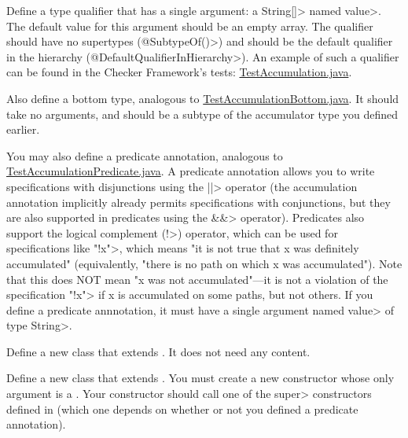 Define a type qualifier that has a single argument: a \<String[]> named \<value>.
The default value for this argument should be an empty array. The
qualifier should have no supertypes (\<@SubtypeOf({})>) and should
be the default qualifier in the hierarchy (\<@DefaultQualifierInHierarchy>).
An example of such a qualifier can be found in the Checker Framework's tests:
\href{https://github.com/typetools/checker-framework/blob/master/framework/src/test/java/testaccumulation/qual/TestAccumulation.java}{TestAccumulation.java}.

Also define a bottom type, analogous to
\href{https://github.com/typetools/checker-framework/blob/master/framework/src/test/java/testaccumulation/qual/TestAccumulationBottom.java}{TestAccumulationBottom.java}.
It should take no arguments, and should be a subtype of the accumulator type you defined earlier.

You may also define a predicate annotation, analogous to
\href{https://github.com/typetools/checker-framework/blob/master/framework/src/test/java/testaccumulation/qual/TestAccumulationPredicate.java}{TestAccumulationPredicate.java}.
A predicate annotation allows you to write specifications with disjunctions using the \<||> operator (the accumulation annotation
implicitly already permits specifications with conjunctions, but they are also supported in predicates using the \<\&\&> operator).
Predicates also support the logical complement (\<!>) operator, which can be used for specifications like \<"!x">, which means
"it is not true that x was definitely accumulated" (equivalently, "there is no path on which x was accumulated").
Note that this does NOT mean "x was not accumulated"---it is not a violation of the specification \<"!x"> if x is accumulated
on some paths, but not others.
If you define a predicate annnotation, it must have a single argument named \<value> of type \<String>.


Define a new class that extends .
It does not need any content.

Define a new class that extends .
You must create a new constructor whose only argument is a .
Your constructor should call one of the \<super> constructors defined in
 (which one depends on whether or not
you defined a predicate annotation).


